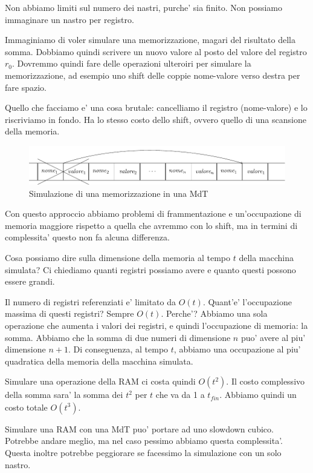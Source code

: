 Non abbiamo limiti sul numero dei nastri, purche' sia finito. Non possiamo immaginare un nastro per
registro.

Immaginiamo di voler simulare una memorizzazione, magari del risultato della somma. Dobbiamo quindi
scrivere un nuovo valore al posto del valore del registro $r_{0}$. Dovremmo quindi fare delle
operazioni ulteroiri per simulare la memorizzazione, ad esempio uno shift delle coppie nome-valore
verso destra per fare spazio.

Quello che facciamo e' una cosa brutale: cancelliamo il registro (nome-valore) e lo riscriviamo in
fondo. Ha lo stesso costo dello shift, ovvero quello di una scansione della memoria.

\begin{figure}[h]
    \begin{center}
        \includegraphics[scale=0.75]{./img/RAMstore.pdf}
        \caption{Simulazione di una memorizzazione in una MdT}
    \end{center}
\end{figure}

Con questo approccio abbiamo problemi di frammentazione e un'occupazione di memoria maggiore
rispetto a quella che avremmo con lo shift, ma in termini di complessita' questo non fa alcuna
differenza.

Cosa possiamo dire sulla dimensione della memoria al tempo $t$ della macchina simulata? Ci chiediamo
quanti registri possiamo avere e quanto questi possono essere grandi.

Il numero di registri referenziati e' limitato da $O(t)$. Quant'e' l'occupazione massima di questi
registri? Sempre $O(t)$. Perche'? Abbiamo una sola operazione che aumenta i valori dei registri, e
quindi l'occupazione di memoria: la somma. Abbiamo che la somma di due numeri di dimensione $n$ puo'
avere al piu' dimensione $n+1$. Di conseguenza, al tempo $t$, abbiamo una occupazione al piu'
quadratica della memoria della macchina simulata.

Simulare una operazione della RAM ci costa quindi $O(t^{2})$. Il costo complessivo della somma sara'
la somma dei $t^{2}$ per $t$ che va da 1 a $t_{\textit{fin}}$. Abbiamo quindi un costo totale
$O(t^{3})$.

Simulare una RAM con una MdT puo' portare ad uno slowdown cubico. Potrebbe andare meglio, ma nel
caso pessimo abbiamo questa complessita'. Questa inoltre potrebbe peggiorare se facessimo la
simulazione con un solo nastro.

